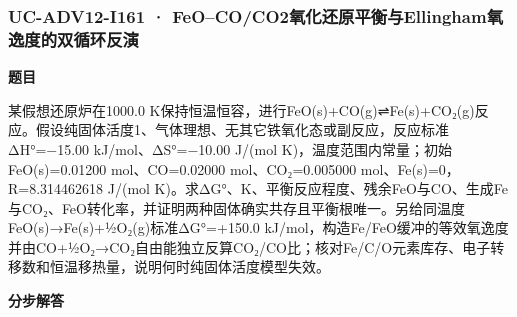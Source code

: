 \documentclass[UTF8,11pt,a4paper]{ctexart}
\begin{document}
\subsubsection*{UC-ADV12-I161 · FeO–CO/CO2氧化还原平衡与Ellingham氧逸度的双循环反演}
\noindent\textbf{题目}\par
某假想还原炉在1000.0 K保持恒温恒容，进行FeO(s)+CO(g)⇌Fe(s)+CO₂(g)反应。假设纯固体活度1、气体理想、无其它铁氧化态或副反应，反应标准ΔH°=−15.00 kJ/mol、ΔS°=−10.00 J/(mol K)，温度范围内常量；初始FeO(s)=0.01200 mol、CO=0.02000 mol、CO₂=0.005000 mol、Fe(s)=0，R=8.314462618 J/(mol K)。求ΔG°、K、平衡反应程度、残余FeO与CO、生成Fe与CO₂、FeO转化率，并证明两种固体确实共存且平衡根唯一。另给同温度FeO(s)→Fe(s)+½O₂(g)标准ΔG°=+150.0 kJ/mol，构造Fe/FeO缓冲的等效氧逸度并由CO+½O₂→CO₂自由能独立反算CO₂/CO比；核对Fe/C/O元素库存、电子转移数和恒温移热量，说明何时纯固体活度模型失效。\par
\medskip\noindent\textbf{分步解答}
\end{document}
